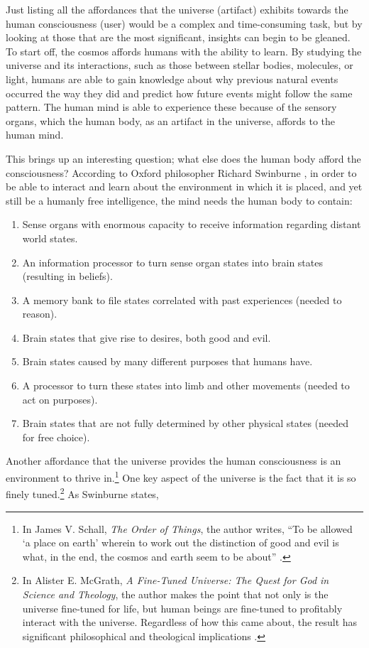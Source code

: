 Just listing all the affordances that the universe (artifact) exhibits
towards the human consciousness (user) would be a complex and
time-consuming task, but by looking at those that are the most
significant, insights can begin to be gleaned. To start off, the cosmos
affords humans with the ability to learn. By studying the universe and
its interactions, such as those between stellar bodies, molecules, or
light, humans are able to gain knowledge about why previous natural
events occurred the way they did and predict how future events might
follow the same pattern. The human mind is able to experience these
because of the sensory organs, which the human body, as an artifact in the universe, affords to the
human mind.

This brings up an interesting question; what else does the human body
afford the consciousness? According to Oxford philosopher Richard
Swinburne \citep[][p.~169]{swinburne2004}, in order to be able to interact and
learn about the environment in which it is placed, and yet still be a
humanly free intelligence, the mind needs the human body to contain:

\begin{enumerate}
\item Sense organs with enormous capacity to receive information regarding
distant world states.
\item An information processor to turn sense organ states into brain states
(resulting in beliefs).
\item A memory bank to file states correlated with past experiences (needed
to reason).
\item Brain states that give rise to desires, both good and evil.
\item Brain states caused by many different purposes that humans have.
\item A processor to turn these states into limb and other movements
(needed to act on purposes).
\item Brain states that are not fully determined by other physical states
(needed for free choice).
\end{enumerate}

Another affordance that the universe provides the human consciousness is
an environment to thrive in.\footnote{%
In James V. Schall, \textit{The Order of Things}, the author writes, ``To be
allowed `a place on earth' wherein to work out the distinction of good
and evil is what, in the end, the cosmos and earth seem to be about'' \citep[][p.~83]{schall2007}.
} One key aspect of the
universe is the fact that it is so finely tuned.\footnote{%
In Alister E. McGrath, \textit{A Fine-Tuned
Universe: The Quest for God in Science and Theology}, the author makes the point that not
only is the universe fine-tuned for life, but human beings are
fine-tuned to profitably interact with the universe. Regardless of how
this came about, the result has significant philosophical and
theological implications \citep{mcgrath2009}.
} As
Swinburne states, 

